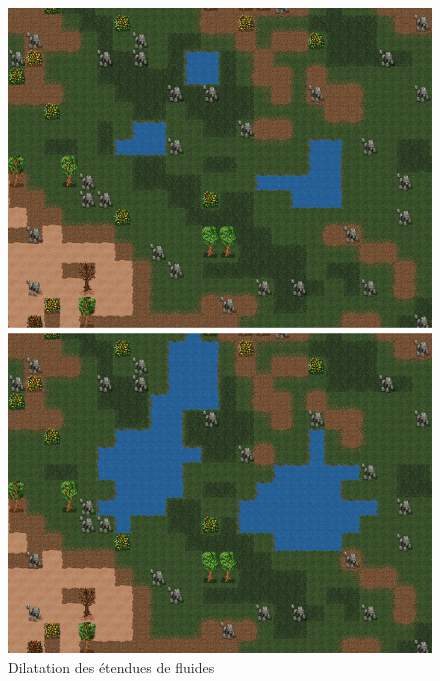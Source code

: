 \documentclass[a4paper]{memoir}
\begin{document}
			\begin{figure}[H]
				\begin{center}
					\includegraphics[scale=0.45]{img/DilateFluid.png}
				\end{center}
				\label{fig:incidenceDeb}
				\caption{Dilatation des étendues de fluides}
			\end{figure}
\end{document}
